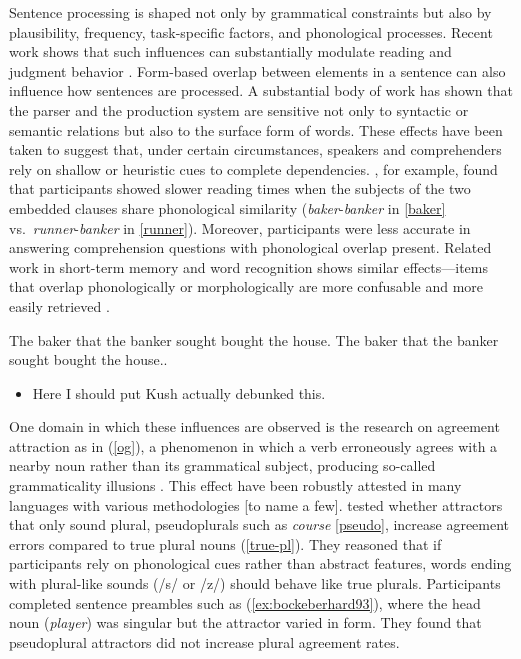 \documentclass[
  authoryear,
  3p]{elsarticle}
\providecommand{\tightlist}{%
  \setlength{\itemsep}{0pt}\setlength{\parskip}{0pt}}
\begin{document}
Sentence processing is shaped not only by grammatical constraints but
also by plausibility, frequency, task-specific factors, and phonological
processes. Recent work shows that such influences can substantially
modulate reading and judgment behavior
\citep{LauraMalsbug24, ArehalliWittenberg2021, HammerlyEtAl2019, LogacevVasishth2016}.
Form-based overlap between elements in a sentence can also influence how
sentences are processed. A substantial body of work has shown that the
parser and the production system are sensitive not only to syntactic or
semantic relations but also to the surface form of words. These effects
have been taken to suggest that, under certain circumstances, speakers
and comprehenders rely on shallow or heuristic cues to complete
dependencies. \citet{AchesonMacDonald2011}, for example, found that
participants showed slower reading times when the subjects of the two
embedded clauses share phonological similarity
(\emph{baker}-\emph{banker} in \ref{baker}
vs.~\emph{runner}-\emph{banker} in \ref{runner}). Moreover, participants
were less accurate in answering comprehension questions with
phonological overlap present. Related work in short-term memory and word
recognition shows similar effects---items that overlap phonologically or
morphologically are more confusable and more easily retrieved
\citep{CopelandRadvansky2001, RastleDavis2008}.

\begin{exe}
\ex \label{baker} The baker that the banker sought bought the house.
\ex \label{runner} The baker that the banker sought bought the house..
\end{exe}

\begin{itemize}
\tightlist
\item
  Here I should put Kush actually debunked this.
\end{itemize}

One domain in which these influences are observed is the research on
agreement attraction as in (\ref{og}), a phenomenon in which a verb
erroneously agrees with a nearby noun rather than its grammatical
subject, producing so-called grammaticality illusions
\citep{BockMiller:1991, PearlmutterGarnseyBock:1999}. This effect have
been robustly attested in many languages with various methodologies
{[}to name a few{]}. \citet{BockEberhard1993} tested whether attractors
that only sound plural, pseudoplurals such as \emph{course}
\ref{pseudo}, increase agreement errors compared to true plural nouns
(\ref{true-pl}). They reasoned that if participants rely on phonological
cues rather than abstract features, words ending with plural-like sounds
(/s/ or /z/) should behave like true plurals. Participants completed
sentence preambles such as (\ref{ex:bockeberhard93}), where the head
noun (\emph{player}) was singular but the attractor varied in form. They
found that pseudoplural attractors did not increase plural agreement
rates.
\end{document}
